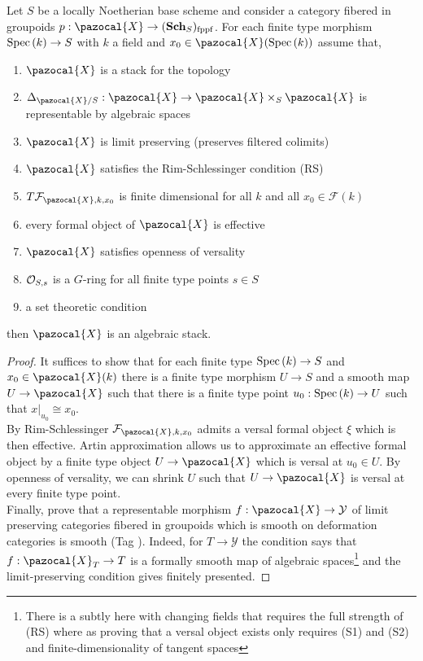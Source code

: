 \documentclass[12pt]{article}
\renewcommand{\X}{\pazocal{X}}
\newcommand{\Y}{\mathcal{Y}}
\renewcommand{\F}{\mathcal{F}}
\begin{document}
\begin{theorem}
Let $S$ be a locally Noetherian base scheme and consider a category fibered in groupoids $p : \X \to (\Sch_S)_{\fppf}$. For each finite type morphism $\mathrm{Spec}\left( k \right) \to S$ with $k$ a field and $x_0 \in \X(\Spec{k})$  assume that,
\begin{enumerate}
\item $\X$ is a stack for the \etale topology
\item $\Delta_{\X / S} : \X \to \X \times_S \X$ is representable by algebraic spaces
\item $\X$ is limit preserving (preserves filtered colimits)
\item $\X$ satisfies the Rim-Schlessinger condition (RS)
\item $T \F_{\X, k, x_0}$ is finite dimensional for all $k$ and all $x_0 \in \F(k)$
\item every formal object of $\X$ is effective
\item $\X$ satisfies openness of versality
\item $\mathcal{O}_{S, s}$ is a $G$-ring for all finite type points $s \in S$ 
\item a set theoretic condition
\end{enumerate}
then $\X$ is an algebraic stack. 
\end{theorem}

\begin{proof}
It suffices to show that for each finite type $\mathrm{Spec}\left( k \right) \to S$ and $x_0 \in \X(k)$ there is a finite type morphism $U \to S$ and a smooth map $U \to \X$ such that there is a finite type point $u_0 : \mathrm{Spec}\left( k \right) \to U$ such that $x|_{u_0} \cong x_0$.
\bigskip\\
By Rim-Schlessinger $\F_{\X, k, x_0}$ admits a versal formal object $\xi$ which is then effective. Artin approximation allows us to approximate an effective formal object by a finite type object $U \to \X$ which is versal at $u_0 \in U$. By openness of versality, we can shrink $U$ such that $U \to \X$ is versal at every finite type point.  
\bigskip\\
Finally, prove that a representable morphism $f : \X \to \Y$ of limit preserving categories fibered in groupoids which is smooth on deformation categories is smooth (Tag ). Indeed, for $T \to \Y$ the condition says that $f : \X_T \to T$ is a formally smooth map of algebraic spaces\footnote{There is a subtly here with changing fields that requires the full strength of (RS) where as proving that a versal object exists only requires (S1) and (S2) and finite-dimensionality of tangent spaces} and the limit-preserving condition gives finitely presented. 
\end{proof}
\end{document}
